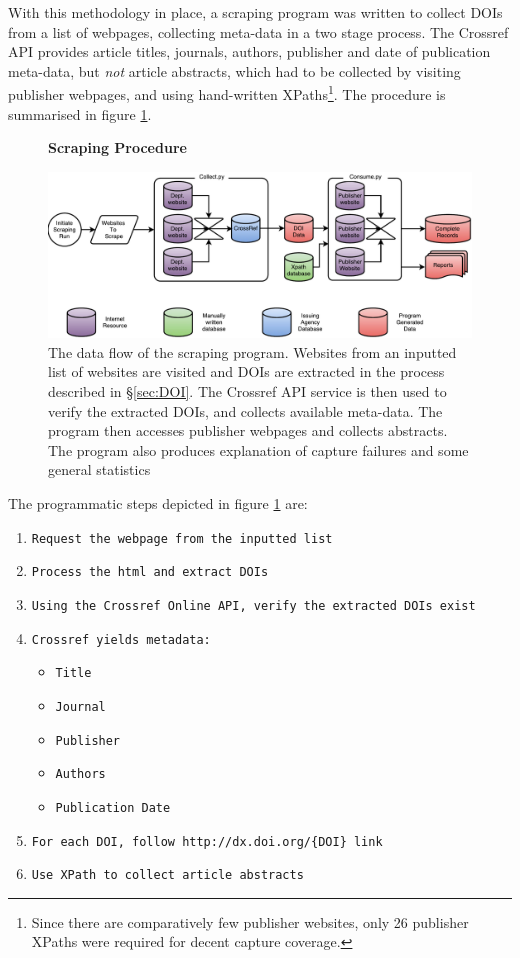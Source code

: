 With this methodology in place, a scraping program was written to collect DOIs from a list of webpages, collecting meta-data in a two stage process. The Crossref API provides article titles, journals, authors, publisher and date of publication meta-data, but \emph{not} article abstracts, which had to be collected by visiting publisher webpages, and using hand-written XPaths\footnote{Since there are comparatively few publisher websites, only 26 publisher XPaths were required for decent capture coverage.}. The procedure is summarised in figure \ref{fig:Cherry}.
\begin{figure}[H]
    \centering
    \textbf{Scraping Procedure}\par\medskip
    \includegraphics[width=\textwidth]{Data_Acquisition/Cherry2.pdf}
    \caption[Data Flow in Scraping Procedure]{The data flow of the scraping program. Websites from an inputted list of websites are visited and DOIs are extracted in the process described in  \S\ref{sec:DOI}. The Crossref API service is then used to verify the extracted DOIs, and collects available meta-data. The program then accesses publisher webpages and collects abstracts. The program also produces explanation of capture failures and some general statistics}
\label{fig:Cherry}
\end{figure}
The programmatic steps depicted in figure \ref{fig:Cherry} are:
\begin{sloppypar}
\begin{enumerate}
\itemsep-0.5em 
\item \texttt{Request the webpage from the inputted list}
\item \texttt{Process the html and extract DOIs}
\item \texttt{Using the Crossref Online API, verify the extracted DOIs exist}
\item \texttt{Crossref yields metadata:}
\begin{itemize}
\itemsep-0.5em 
\item \texttt{Title}
\item \texttt{Journal}
\item \texttt{Publisher}
\item \texttt{Authors}
\item \texttt{Publication Date}
\end{itemize}
\item \texttt{For each DOI,  follow \texttt{http://dx.doi.org/\{DOI\}} link}
\item \texttt{Use XPath to collect article abstracts}
\end{enumerate}
\end{sloppypar}
